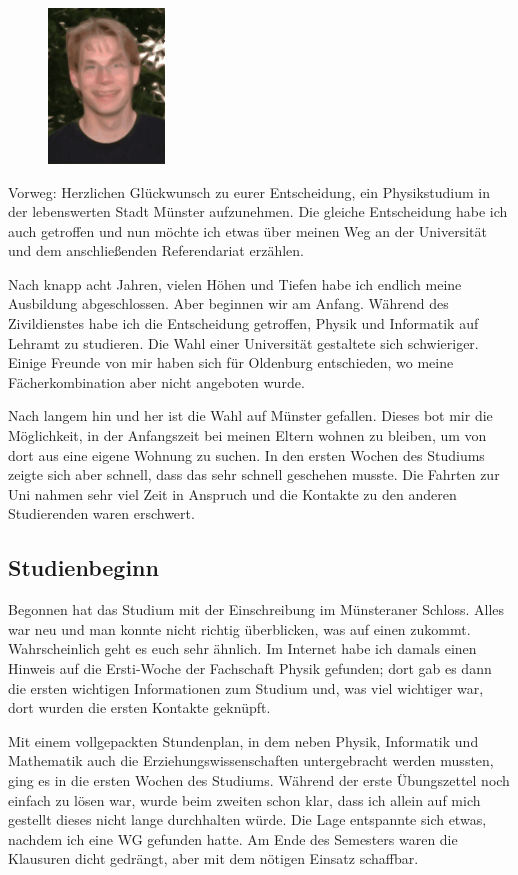 \begin{multicols*}{2}
\begin{figure}
	\includegraphics[width=3.1cm]{res/johannes_pieper.pdf}
\end{figure}
Vorweg: Herzlichen Glückwunsch zu eurer Entscheidung, ein Physikstudium in der lebenswerten Stadt Münster aufzunehmen.
Die gleiche Entscheidung habe ich auch getroffen und nun möchte ich etwas über meinen Weg an der Universität und dem anschließenden Referendariat erzählen.

Nach knapp acht Jahren, vielen Höhen und Tiefen habe ich endlich meine Ausbildung abgeschlossen.
Aber beginnen wir am Anfang.
Während des Zivildienstes habe ich die Entscheidung getroffen, Physik und Informatik auf Lehramt zu studieren.
Die Wahl einer Universität gestaltete sich schwieriger.
Einige Freunde von mir haben sich für Oldenburg entschieden, wo meine Fächerkombination aber nicht angeboten wurde.

Nach langem hin und her ist die Wahl auf Münster gefallen.
Dieses bot mir die Möglichkeit, in der Anfangszeit bei meinen Eltern wohnen zu bleiben, um von dort aus eine eigene Wohnung zu suchen.
In den ersten Wochen des Studiums zeigte sich aber schnell, dass das sehr schnell geschehen musste.
Die Fahrten zur Uni nahmen sehr viel Zeit in Anspruch und die Kontakte zu den anderen Studierenden waren erschwert.

\subsection{Studienbeginn}
Begonnen hat das Studium mit der Einschreibung im Münsteraner Schloss.
Alles war neu und man konnte nicht richtig überblicken, was auf einen zukommt.
Wahrscheinlich geht es euch sehr ähnlich.
Im Internet habe ich damals einen Hinweis auf die Ersti-Woche der Fachschaft Physik gefunden; dort gab es dann die ersten wichtigen Informationen zum Studium und, was viel wichtiger war, dort wurden die ersten Kontakte geknüpft.

Mit einem vollgepackten Stundenplan, in dem neben Physik, Informatik und Mathematik auch die Erziehungswissenschaften untergebracht werden mussten, ging es in die ersten Wochen des Studiums.
Während der erste Übungszettel noch einfach zu lösen war, wurde beim zweiten schon klar, dass ich allein auf mich gestellt dieses nicht lange durchhalten würde.
Die Lage entspannte sich etwas, nachdem ich eine WG gefunden hatte.
Am Ende des Semesters waren die Klausuren dicht gedrängt, aber mit dem nötigen Einsatz schaffbar.


\end{multicols*}
